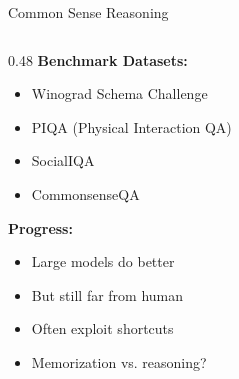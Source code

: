 \documentclass[aspectratio=169]{beamer}
\begin{document}
\begin{frame}[shrink=10]{Common Sense Reasoning 🤯}
\begin{columns}[T]
\begin{column}{0.48\textwidth}
\vspace{1em}
\textbf{Benchmark Datasets:}
\begin{itemize}\setlength{\itemsep}{0pt}
    \item Winograd Schema Challenge
    \item PIQA (Physical Interaction QA)
    \item SocialIQA
    \item CommonsenseQA
\end{itemize}

\vspace{0.5em}
\textbf{Progress:}
\begin{itemize}\setlength{\itemsep}{0pt}
    \item Large models do better
    \item But still far from human
    \item Often exploit shortcuts
    \item Memorization vs. reasoning?
\end{itemize}
\end{column}
\end{columns}
\end{frame}
\end{document}
